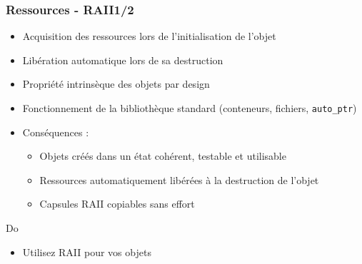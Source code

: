 \documentclass[C++.tex]{subfiles}
\begin{document}
\begin{frame}
	\frametitle{Ressources - RAII\titlehfill{}1/2}


	\begin{itemize}
		\item Acquisition des ressources lors de l'initialisation de l'objet
		\item Libération automatique lors de sa destruction


		\item Propriété intrinsèque des objets \og par design\fg{}


		\item Fonctionnement de la bibliothèque standard (conteneurs, fichiers, \lstinline|auto_ptr|)
		\item Conséquences :
		\begin{itemize}
			\item Objets créés dans un état cohérent, testable et utilisable
			\item Ressources automatiquement libérées à la destruction de l'objet

			
			\item Capsules RAII copiables sans effort
		\end{itemize}
	\end{itemize}

	\begin{exampleblock}{Do}
		\begin{itemize}
			\item Utilisez RAII pour vos objets
		\end{itemize}
	\end{exampleblock}
\end{frame}
\end{document}
